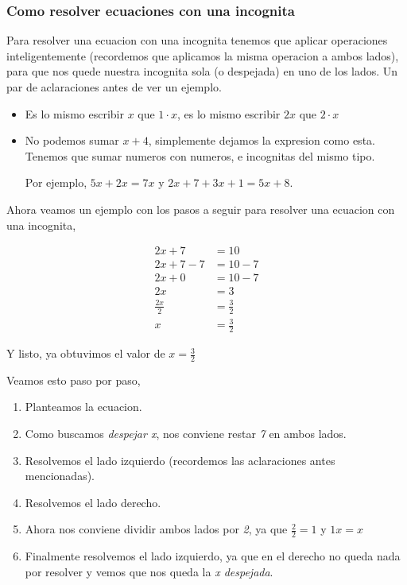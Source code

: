 \documentclass{article}
\begin{document}
\subsubsection*{Como resolver ecuaciones con una incognita}
\begin{small}
Para resolver una ecuacion con una incognita tenemos que aplicar operaciones inteligentemente (recordemos que aplicamos la misma operacion a ambos lados), para que nos quede nuestra incognita sola (o despejada) en uno de los lados.
Un par de aclaraciones antes de ver un ejemplo.
\begin{itemize}
	\item Es lo mismo escribir $x$ que $1\cdot x$, es lo mismo escribir $2x$ que $2\cdot x$
	\item No podemos sumar $x+4$, simplemente dejamos la expresion como esta. Tenemos que sumar numeros con numeros, e incognitas del mismo tipo. 
	
	Por ejemplo, $5x+2x=7x$ y $2x+7+3x+1=5x+8$.
\end{itemize}

Ahora veamos un ejemplo con los pasos a seguir para resolver una ecuacion con una incognita,

\begin{align}
2x+7 &= 10\\2x+7-7&=10-7\\2x+0&=10-7\\2x&=3\\\frac{2x}{2}&=\frac{3}{2}\\x&=\frac{3}{2}
\end{align}

Y listo, ya obtuvimos el valor de $x=\frac{3}{2}$

Veamos esto paso por paso,
\begin{enumerate}
	\item Planteamos la ecuacion.
	\item Como buscamos \textit{despejar x}, nos conviene restar \textit{7} en ambos lados.
	\item Resolvemos el lado izquierdo (recordemos las aclaraciones antes mencionadas).
	\item Resolvemos el lado derecho.
	\item Ahora nos conviene dividir ambos lados por \textit{2}, ya que $\frac{2}{2}=1$ y $1x=x$
	\item Finalmente resolvemos el lado izquierdo, ya que en el derecho no queda nada por resolver y vemos que nos queda la \textit{x despejada}.
\end{enumerate}
\end{small}
\end{document}
